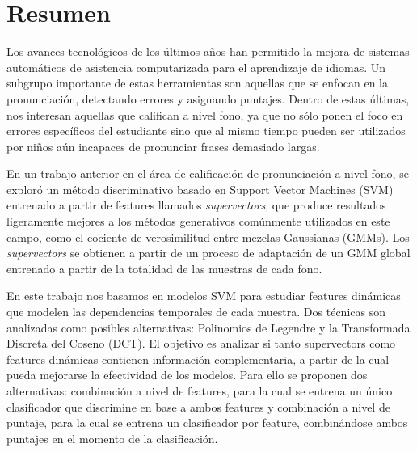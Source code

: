 \chapter*{Resumen}

Los avances tecnológicos de los últimos años han permitido la mejora de sistemas
automáticos de asistencia computarizada para el aprendizaje de idiomas.
Un subgrupo importante de estas herramientas son aquellas que se enfocan en la pronunciación,
detectando errores y asignando puntajes. Dentro de estas últimas, nos interesan
aquellas que califican a nivel fono, ya que
no sólo ponen el foco en errores específicos del estudiante sino que al mismo tiempo
pueden ser utilizados por niños aún incapaces de pronunciar frases
demasiado largas.


En un trabajo anterior en el área de calificación de pronunciación a nivel fono,
se exploró
un método discriminativo basado en Support Vector Machines (SVM) entrenado
a partir de features llamados \textit{supervectors},
que produce resultados ligeramente mejores a los métodos
generativos comúnmente utilizados en este campo, como el cociente de verosimilitud
entre mezclas Gaussianas (GMMs). Los \textit{supervectors} se obtienen a partir de
un proceso de adaptación de un GMM global entrenado a partir de la totalidad
de las muestras de cada fono.

En este trabajo nos basamos en modelos SVM para
estudiar features dinámicas que modelen las dependencias
temporales de cada muestra. Dos técnicas son analizadas como posibles alternativas:
Polinomios de Legendre y la Transformada Discreta del Coseno (DCT).
El objetivo
es analizar si tanto supervectors como features dinámicas
contienen información complementaria,
a partir de la cual pueda mejorarse la efectividad de los modelos.
Para ello
se proponen dos alternativas: combinación a nivel de features,
para la cual se entrena un único clasificador que discrimine en base a ambos features
y combinación a nivel de puntaje,
para la cual se entrena un clasificador por feature, combinándose ambos puntajes
en el momento de la clasificación.


